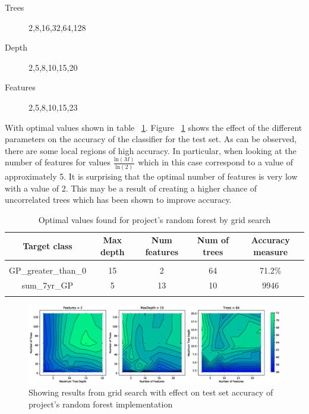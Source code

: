 \documentclass{article} %
\begin{document}
\begin{description}
\item [Trees] 2,8,16,32,64,128
\item [Depth] 2,5,8,10,15,20
\item [Features] 2,5,8,10,15,23
\end{description}

With optimal values shown in table ~\ref{opt-table}. Figure ~\ref{fig:gridSClass} shows the effect of the different parameters on the accuracy of the classifier for the test set. As can be observed, there are some local regions of high accuracy. In particular, when looking at the number of features for values $\frac{\text{ln}(M)}{\text{ln}(2)}$ which in this case correspond to a value of approximately 5. It is surprising that the optimal number of features is very low with a value of 2. This may be a result of creating a higher chance of uncorrelated trees which has been shown to improve accuracy. \cite{Bharathidason2014}

\begin{table}[h]
\caption{Optimal values found for project's random forest by grid search}
\begin{center}
\begin{tabular}{ccccc}
{\bf Target class} &{\bf Max depth} &{\bf Num features} &{\bf Num of trees}&{\bf Accuracy measure}
\\ \hline \\
GP\_greater\_than\_0         &15	&2	&64 &71.2\%\\
sum\_7yr\_GP         &5	&13	&10 		&9946\\
\label{opt-table}
\end{tabular}
\end{center}
\end{table}

\begin{figure}[ht]
\includegraphics[width=1.1\textwidth]{gridSClass}
\caption{Showing results from grid search with effect on test set accuracy of project's random forest implementation}
\label{fig:gridSClass}
\end{figure}
\end{document}
